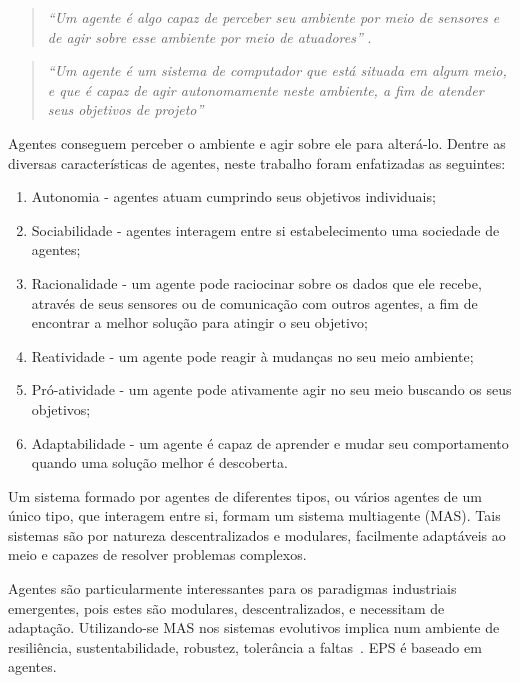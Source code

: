 \begin{quote}
	\textit{``Um agente é algo capaz de perceber seu ambiente por meio de sensores e de agir sobre esse ambiente por meio de atuadores''} \cite{Russell_Norvig1995}.
\end{quote}

\begin{quote}
	\textit{``Um agente é um sistema de computador que está situada em algum meio, e que é capaz de agir autonomamente neste ambiente, a fim de atender seus objetivos de projeto''} \cite{WOOLDRIDGE2002,WOOLDRIDGE2007}
\end{quote}

Agentes conseguem perceber o ambiente e agir sobre ele para alterá-lo. Dentre as diversas características de agentes, neste trabalho foram enfatizadas as seguintes: 

\begin{enumerate}
	\item Autonomia - agentes atuam cumprindo seus objetivos individuais; 
	
	\item Sociabilidade - agentes interagem entre si estabelecimento uma sociedade de agentes; 
	
	\item Racionalidade - um agente pode raciocinar sobre os dados que ele recebe, através de seus sensores ou de comunicação com outros agentes, a fim de encontrar a melhor solução para atingir o seu objetivo; 
	
	\item Reatividade - um agente pode reagir à mudanças no seu meio ambiente; 
	
	\item Pró-atividade - um agente pode ativamente agir no seu meio buscando os seus objetivos;
	
	\item Adaptabilidade - um agente é capaz de aprender e mudar seu comportamento quando uma solução melhor é descoberta. 
\end{enumerate}

Um sistema formado por agentes de diferentes tipos, ou vários agentes de um único tipo, que interagem entre si, formam um sistema multiagente (MAS). Tais sistemas são por natureza descentralizados e modulares, facilmente adaptáveis ao meio e capazes de resolver problemas complexos. 

Agentes são particularmente interessantes para os paradigmas industriais emergentes, pois estes são modulares, descentralizados, e necessitam de adaptação. Utilizando-se MAS nos sistemas evolutivos implica num ambiente de resiliência, sustentabilidade, robustez, tolerância a faltas~\cite{RIBEIRO2013a}. EPS é baseado em agentes. 

